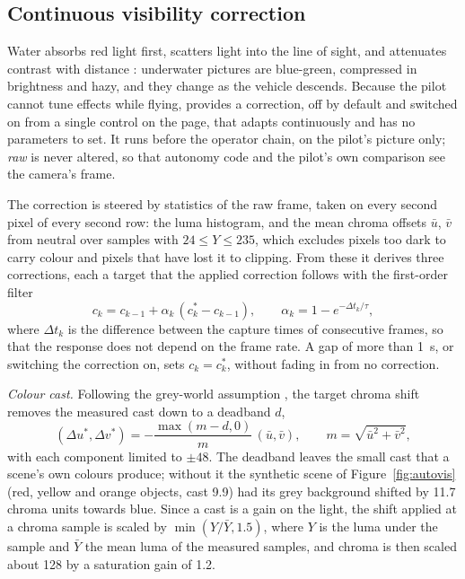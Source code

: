 \subsection{Continuous visibility correction}\label{sec:autovis}

Water absorbs red light first, scatters light into the line of sight,
and attenuates
contrast with distance \cite{jaffe1990,schettini2010}: underwater pictures are
blue-green, compressed in brightness and hazy, and they change as the vehicle
descends. Because the pilot cannot tune effects while flying, \eeye{} provides a
correction, off by default and switched on from a single control on
the page, that
adapts continuously and has no parameters to set. It runs before the
operator chain,
on the pilot's picture only; \emph{raw} is never altered, so that
autonomy code and the
pilot's own comparison see the camera's frame.

The correction is steered by statistics of the raw frame, taken on
every second pixel
of every second row: the luma histogram, and the mean chroma offsets $\bar u$,
$\bar v$ from neutral over samples with $24 \leq Y \leq 235$, which
excludes pixels
too dark to carry colour and pixels that have lost it to clipping. From these it
derives three corrections, each a target that the applied correction
follows with the
first-order filter
\begin{equation}\label{eq:smooth}
  c_k = c_{k-1} + \alpha_k\,(c^{*}_k - c_{k-1}), \qquad
  \alpha_k = 1 - e^{-\Delta t_k/\tau},
\end{equation}
where $\Delta t_k$ is the difference between the capture times of
consecutive frames,
so that the response does not depend on the frame rate. A gap of more
than 1~s, or
switching the correction on, sets $c_k = c^{*}_k$, without fading in
from no correction.

\emph{Colour cast.} Following the grey-world assumption
\cite{buchsbaum1980}, the
target chroma shift removes the measured cast down to a deadband $d$,
\begin{equation}\label{eq:cast}
  (\Delta u^{*}, \Delta v^{*}) = -\frac{\max(m - d, 0)}{m}\,(\bar u, \bar v),
  \qquad m = \sqrt{\bar u^2 + \bar v^2},
\end{equation}
with each component limited to $\pm 48$. The deadband leaves the
small cast that a
scene's own colours produce; without it the synthetic scene of
Figure~\ref{fig:autovis}
(red, yellow and orange objects, cast 9.9) had its grey background
shifted by 11.7
chroma units towards blue. Since a cast is a gain on the light, the
shift applied at a
chroma sample is scaled by $\min(Y/\bar Y, 1.5)$, where $Y$ is the
luma under the
sample and $\bar Y$ the mean luma of the measured samples, and chroma
is then scaled
about 128 by a saturation gain of 1.2.

